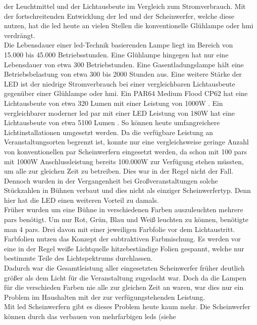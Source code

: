 \documentclass[11pt]{scrartcl}
\begin{document}
der Leuchtmittel und der Lichtausbeute im Vergleich zum Stromverbrauch. Mit der fortschreitenden Entwicklung der \ac{led} und der
Scheinwerfer, welche diese nutzen, hat die \ac{led} heute an vielen Stellen die konventionelle Glühlampe oder \ac{hmi} verdrängt.\\
Die Lebensdauer einer \ac{led}-Technik basierenden Lampe liegt im Bereich von 15.000 bis 45.000 Betriebsstunden. Eine Glühlampe hingegen
hat nur eine Lebensdauer von etwa 300 Betriebstunden. Eine Gasentladungslampe hält eine Betriebsbelastung von etwa 300 bis 2000 Stunden aus.
Eine weitere Stärke der LED ist der niedrige Stromverbrauch bei einer vergleichbaren Lichtausbeute gegenüber einer Glühlampe oder \ac{hmi}.
Ein PAR64 Medium Flood CP62 hat eine Lichtausbeute von etwa 320 Lumen mit einer Leistung von 1000W \cite{convpar}. Ein vergleichbarer moderner
\ac{led} \ac{par} mit einer LED Leistung von 180W hat eine Lichtausbeute von etwa 5100 Lumen \cite{ledpar}. So können heute umfangreichere
Lichtinstallationen umgesetzt werden. Da die verfügbare Leistung an Veranstaltungsorten begrenzt ist, konnte nur eine vergleichsweise geringe
Anzahl von konventionellen \ac{par} Scheinwerfern eingesetzt werden, da schon mit 100 \ac{par}s mit 1000W Anschlussleistung bereits
100.000W zur Verfügung stehen müssten, um alle zur gleichen Zeit zu betreiben. Dies war in der Regel nicht der Fall. Dennoch wurden in der
Vergangenheit bei Großveranstaltungen solche Stückzahlen in Bühnen verbaut und dies nicht als einziger Scheinwerfertyp.
Denn hier hat die LED einen weiteren Vorteil zu damals.\\
Früher wurden um eine Bühne in verschiedenen Farben auszuleuchten mehrere \ac{par}s benötigt. Um nur Rot, Grün, Blau und Weiß leuchten zu
können, benötigte man 4 \ac{par}s. Drei davon mit einer jeweiligen Farbfolie vor dem Lichtaustritt. Farbfolien nutzen das Konzept der
subtraktiven Farbmischung. Es werden vor eine in der Regel weiße Lichtquelle hitzebeständige Folien gespannt, welche nur bestimmte Teile des 
Lichtspektrums durchlassen.\\
Dadurch war die Gesamtleistung aller eingesetzten Scheinwerfer früher deutlich größer als dem Licht für die Veranstaltung zugedacht war. Doch
da die Lampen für die verschieden Farben nie alle zur gleichen Zeit an waren, war dies nur ein Problem im Haushalten mit der zur verfügungstehenden
Leistung.\\
Mit \ac{led} Scheinwerfern gibt es dieses Problem heute kaum mehr. Die Scheinwerfer können durch das verbauen von mehrfarbigen \ac{led}s (siehe
\end{document}
